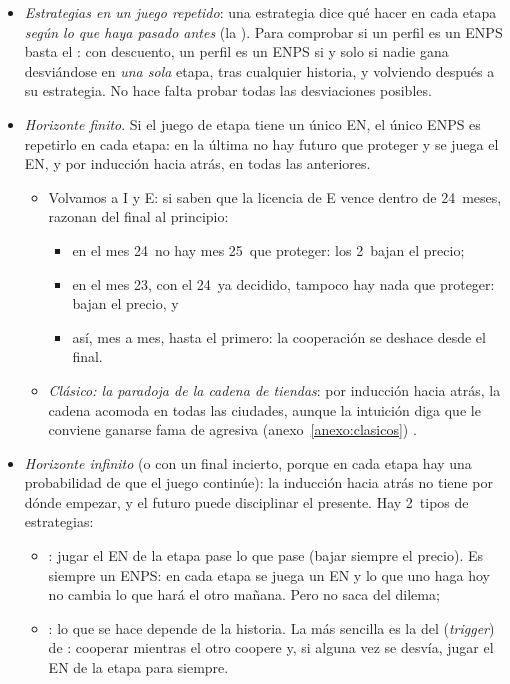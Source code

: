 \documentclass[11pt]{article}
\begin{document}
\begin{itemize}
\item \emph{Estrategias en un juego repetido}: una estrategia dice qué hacer en cada etapa \emph{según lo que haya pasado antes} (la ). Para comprobar si un perfil es un ENPS basta el : con descuento, un perfil es un ENPS si y solo si nadie gana desviándose en \emph{una sola} etapa, tras cualquier historia, y volviendo después a su estrategia\nocite{FudenbergTirole1991Game}. No hace falta probar todas las desviaciones posibles.
\item \emph{Horizonte finito}. Si el juego de etapa tiene un único EN, el único ENPS es repetirlo en cada etapa: en la última no hay futuro que proteger y se juega el EN, y por inducción hacia atrás, en todas las anteriores.
  \begin{itemize}
  \item Volvamos a \textup{I} y E: si saben que la licencia de E vence dentro de 24~meses, razonan del final al principio:
    \begin{itemize}
    \item en el mes 24~no hay mes 25~que proteger: los 2~bajan el precio;
    \item en el mes 23, con el 24~ya decidido, tampoco hay nada que proteger: bajan el precio, y
    \item así, mes a mes, hasta el primero: la cooperación se deshace desde el final.
    \end{itemize}
  \item \emph{Clásico: la paradoja de la cadena de tiendas}\nocite{Selten1978Chain}: por inducción hacia atrás, la cadena acomoda en todas las ciudades, aunque la intuición diga que le conviene ganarse fama de agresiva (anexo~\ref{anexo:clasicos}) .
  \end{itemize}
\item \emph{Horizonte infinito} (o con un final incierto, porque en cada etapa hay una probabilidad de que el juego continúe): la inducción hacia atrás no tiene por dónde empezar, y el futuro puede disciplinar el presente. Hay 2~tipos de estrategias:
  \begin{itemize}
  \item {}: jugar el EN de la etapa pase lo que pase (bajar siempre el precio). Es siempre un ENPS: en cada etapa se juega un EN y lo que uno haga hoy no cambia lo que hará el otro mañana. Pero no saca del dilema;
  \item {}: lo que se hace depende de la historia. La más sencilla es la del  (\emph{trigger}) de \textcite{Friedman1971Supergames}: cooperar mientras el otro coopere y, si alguna vez se desvía, jugar el EN de la etapa para siempre.


\end{itemize}
\end{itemize}
\end{document}
